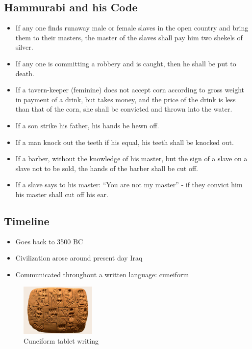 \documentclass[11pt]{article}
\begin{document}
\subsection{Hammurabi and his Code}
\label{sec-3.5}

\begin{itemize}
\item If any one finds runaway male or female slaves in the open country and bring them to their masters, the master of the slaves shall pay him two shekels of silver.
\item If any one is committing a robbery and is caught, then he shall be put to death.
\item If a tavern-keeper (feminine) does not accept corn according to gross weight in payment of a drink, but takes money, and the price of the drink is less than that of the corn, she shall be convicted and thrown into the water.
\item If a son strike his father, his hands be hewn off.
\item If a man knock out the teeth if his equal, his teeth shall be knocked out.
\item If a barber, without the knowledge of his master, but the sign of a slave on a slave not to be sold, the hands of the barber shall be cut off.
\item If a slave says to his master: ``You are not my master'' - if they convict him his master shall cut off his ear.
\end{itemize}
\subsection{Timeline}
\label{sec-3.6}

\begin{itemize}
\item Goes back to 3500 BC
\item Civilization arose around present day Iraq
\item Communicated throughout a written language: cuneiform
\end{itemize}
\begin{figure}[htb]
\centering
\includegraphics[width=10em]{./img/CuneiformTablet.png}
\caption{Cuneiform tablet writing}
\end{figure}
\end{document}
